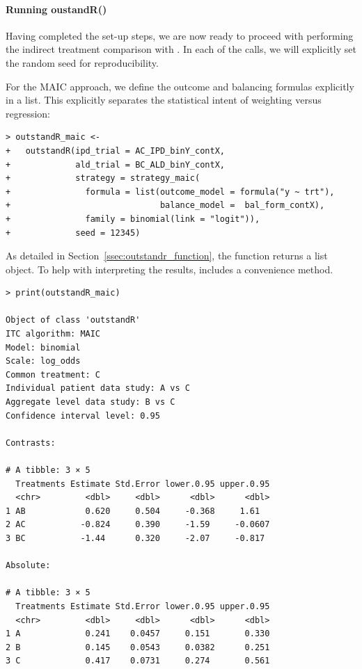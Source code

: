 \documentclass[article]{jss}
\begin{document}
\paragraph{Running oustandR()}
Having completed the set-up steps, we are now ready to proceed with performing the indirect treatment comparison with . In each of the calls, we will explicitly set the random seed for reproducibility.

For the MAIC approach, we define the outcome and balancing formulas explicitly in a list. This explicitly separates the statistical intent of weighting versus regression:

\begin{verbatim}
> outstandR_maic <-
+   outstandR(ipd_trial = AC_IPD_binY_contX,
+             ald_trial = BC_ALD_binY_contX,
+             strategy = strategy_maic(
+               formula = list(outcome_model = formula("y ~ trt"),
+                              balance_model =  bal_form_contX),
+               family = binomial(link = "logit")),
+             seed = 12345)
\end{verbatim}

As detailed in Section~\ref{ssec:outstandr_function}, the  function returns a list object. To help with interpreting the results,  includes a convenience  method.

\begin{verbatim}
> print(outstandR_maic)

Object of class 'outstandR' 
ITC algorithm: MAIC 
Model: binomial 
Scale: log_odds 
Common treatment: C 
Individual patient data study: A vs C 
Aggregate level data study: B vs C 
Confidence interval level: 0.95 

Contrasts:

# A tibble: 3 × 5
  Treatments Estimate Std.Error lower.0.95 upper.0.95
  <chr>         <dbl>     <dbl>      <dbl>      <dbl>
1 AB            0.620     0.504     -0.368     1.61  
2 AC           -0.824     0.390     -1.59     -0.0607
3 BC           -1.44      0.320     -2.07     -0.817 

Absolute:

# A tibble: 3 × 5
  Treatments Estimate Std.Error lower.0.95 upper.0.95
  <chr>         <dbl>     <dbl>      <dbl>      <dbl>
1 A             0.241    0.0457     0.151       0.330
2 B             0.145    0.0543     0.0382      0.251
3 C             0.417    0.0731     0.274       0.561
\end{verbatim}
\end{document}
